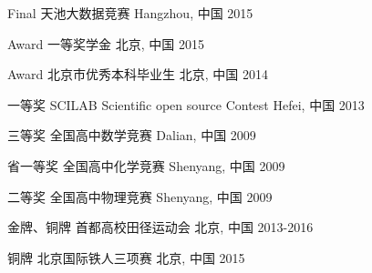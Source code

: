 \begin{cvhonors}
\cvhonor
{Final} %
{天池大数据竞赛} %
{Hangzhou, 中国} %
{2015} %






\cvhonor
{Award} %
{一等奖学金} %
{北京, 中国} %
{2015} %


\cvhonor
{Award} %
{北京市优秀本科毕业生} %
{北京, 中国} %
{2014} %



\cvhonor
{一等奖} %
{SCILAB Scientific open source Contest} %
{Hefei, 中国} %
{2013} %


\cvhonor
{三等奖} %
{全国高中数学竞赛} %
{Dalian, 中国} %
{2009} %

\cvhonor
{省一等奖} %
{全国高中化学竞赛} %
{Shenyang, 中国} %
{2009} %

\cvhonor
{二等奖} %
{全国高中物理竞赛} %
{Shenyang, 中国} %
{2009} %

\cvhonor
{金牌、铜牌} %
{首都高校田径运动会} %
{北京, 中国} %
{2013-2016} %

\cvhonor
{铜牌} %
{北京国际铁人三项赛} %
{北京, 中国} %
{2015} %


\end{cvhonors}
